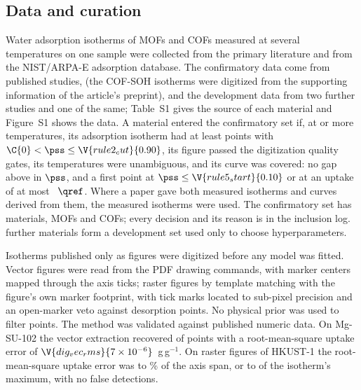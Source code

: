 \documentclass[journal=jcisd8,manuscript=article]{achemso}
\begin{document}
\subsection*{Data and curation}

Water adsorption isotherms of MOFs and COFs measured at several temperatures on one sample were collected from the
primary literature and from the NIST/ARPA-E adsorption database\cite{isodb}. The confirmatory
data come from published
studies\cite{hanikel2019,taylor2012,nguyen2020,nguyen2022,schweng2024,rieth2017,tan2021,oppenheim2025,grunenberg2023,lin2006},
(the COF-SOH isotherms were digitized from the supporting
information of the article's preprint\cite{schweng2023pre}), and the development data from two further studies and
one of the same\cite{rezk2012,cadiau2015,tan2021}; Table~S1 gives the source of
each material and Figure~S1 shows the data. A material entered the confirmatory set if, at
 or more temperatures, its adsorption isotherm had at least  points with
$\C{0} < \pss \le \V{rule2_cut}{0.90}$, its figure passed the digitization quality gates, its temperatures were
unambiguous, and its curve was covered: no gap above  in $\pss$, and a first point at
$\pss \le \V{rule5_start}{0.10}$ or at an uptake of at most ~$\qref$. Where a paper gave both
measured isotherms and curves derived from them, the measured isotherms were used. The confirmatory set has
 materials,  MOFs and  COFs; every decision and its reason is in the inclusion
log.  further materials form a development set used only to choose hyperparameters.

Isotherms published only as figures were digitized before any model was fitted. Vector figures were read from the
PDF drawing commands, with marker centers mapped through the axis ticks; raster figures by template matching with
the figure's own marker footprint, with tick marks located to sub-pixel precision and an open-marker veto against
desorption points. No physical prior was used to filter points. The method was validated against published numeric
data. On Mg-SU-102 the vector extraction recovered  of  points with a
root-mean-square uptake error of $\V{dig_vec_rms}{7\times10^{-6}}$~g\,g$^{-1}$. On raster figures of HKUST-1 the
root-mean-square uptake error was  to \% of the axis span, or
 to  of the isotherm's maximum, with no false detections.
\end{document}
